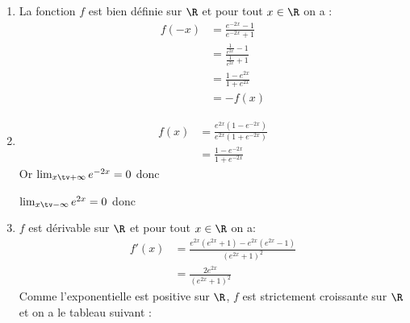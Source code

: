 \documentclass[a4paper, 11pt,reqno]{article}
\begin{document}
\begin{correction}
\begin{enumerate}
\item La fonction $f$ est bien définie sur $\R$ et 
pour tout $x\in \R$ on  a :
\begin{align*}
f(-x)&=\frac{e^{-2x}-1}{e^{-2x}+1}\\
		&=\frac{\frac{1}{e^{2x}}-1}{\frac{1}{e^{2x}}+1}\\
		&=\frac{1-e^{2x}}{1+e^{2x}}\\
		&=-f(x)
\end{align*}
\item 
\begin{align*}
f(x)& = \frac{e^{2x} (1-e^{-2x}) }{e^{2x} (1+e^{-2x})}\\
&=\frac{ 1-e^{-2x} }{1+e^{-2x}}
\end{align*}
Or $\lim_{x\tv +\infty} e^{-2x}=0$ donc

$\lim_{x\tv -\infty} e^{2x}=0$ donc

\item 
$f$ est dérivable sur $\R$ et pour tout $x\in \R$ on a:
\begin{align*}
f'(x) & = \frac{e^{2x} (e^{2x}+1) - e^{2x} (e^{2x}-1) }{ (e^{2x}+1)^2}\\
&=  \frac{2e^{2x}}{ (e^{2x}+1)^2}
\end{align*}
Comme l'exponentielle est  positive sur $\R$, $f$ est strictement croissante sur $\R$ et on a le tableau suivant : 




\end{enumerate}
\end{correction}
\end{document}
